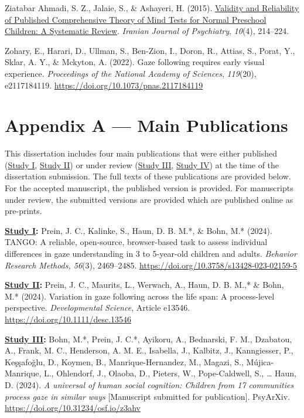 \documentclass[
]{scrbook}
\newlength{\cslhangindent}
\newenvironment{CSLReferences}[2] %
 {\begin{list}{}{%
  \setlength{\itemindent}{0pt}
  \setlength{\leftmargin}{0pt}
  \setlength{\parsep}{0pt}
  \ifodd #1
   \setlength{\leftmargin}{\cslhangindent}
   \setlength{\itemindent}{-1\cslhangindent}
  \fi
  \setlength{\itemsep}{#2\baselineskip}}}
 {\end{list}}
\begin{document}
\begin{CSLReferences}{1}{0}
Ziatabar Ahmadi, S. Z., Jalaie, S., \& Ashayeri, H. (2015). \href{https://www.ncbi.nlm.nih.gov/pmc/articles/PMC4801491}{Validity and {Reliability} of {Published Comprehensive Theory} of {Mind Tests} for {Normal Preschool Children}: {A Systematic Review}}. \emph{Iranian Journal of Psychiatry}, \emph{10}(4), 214--224.

Zohary, E., Harari, D., Ullman, S., Ben-Zion, I., Doron, R., Attias, S., Porat, Y., Sklar, A. Y., \& Mckyton, A. (2022). Gaze following requires early visual experience. \emph{Proceedings of the National Academy of Sciences}, \emph{119}(20), e2117184119. \url{https://doi.org/10.1073/pnas.2117184119}

\end{CSLReferences}

\chapter{Appendix A --- Main Publications}\label{appendixA}

This dissertation includes four main publications that were either published (\hyperref[studyI]{Study I}, \hyperref[studyII]{Study II}) or under review (\hyperref[studyIII]{Study III}, \hyperref[studyIV]{Study IV}) at the time of the dissertation submission. The full texts of these publications are provided below. For the accepted manuscript, the published version is provided. For manuscripts under review, the submitted versions are provided which are published online as pre-prints.

\textbf{\hyperref[studyI]{Study I}:} Prein, J. C., Kalinke, S., Haun, D. B. M.*, \& Bohn, M.* (2024). TANGO: A reliable, open-source, browser-based task to assess individual differences in gaze understanding in 3 to 5-year-old children and adults. \emph{Behavior Research Methods, 56}(3), 2469--2485. \mbox{\url{https://doi.org/10.3758/s13428-023-02159-5}}

\textbf{\hyperref[studyII]{Study II}:} Prein, J. C., Maurits, L., Werwach, A., Haun, D. B. M.,* \& Bohn, M.* (2024). Variation in gaze following across the life span: A process-level perspective. \emph{Developmental Science}, Article e13546. \mbox{\url{https://doi.org/10.1111/desc.13546}}

\textbf{\hyperref[studyIII]{Study III}:} Bohn, M.*, Prein, J. C.*, Ayikoru, A., Bednarski, F. M., Dzabatou, A., Frank, M. C., Henderson, A. M. E., Isabella, J., Kalbitz, J., Kanngiesser, P., Keşşafoğlu, D., Koymen, B., Manrique-Hernandez, M., Magazi, S., Mújica-Manrique, L., Ohlendorf, J., Olaoba, D., Pieters, W., Pope-Caldwell, S., \ldots{} Haun, D. (2024). \emph{A universal of human social cognition: Children from 17 communities process gaze in similar ways} {[}Manuscript submitted for publication{]}. PsyArXiv. \mbox{\url{https://doi.org/10.31234/osf.io/z3ahv}}
\end{document}
